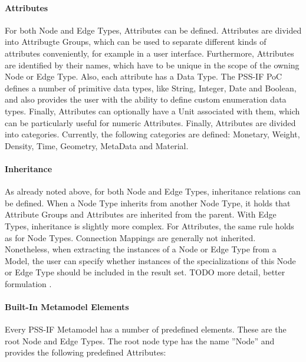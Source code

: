 \paragraph{Attributes}

For both Node and Edge Types, Attributes can be defined. Attributes are divided into Attribugte Groups, which can be used to separate different kinds of attributes conveniently, for example in a user interface. Furthermore, Attributes are identified by their names, which have to be unique in the scope of the owning Node or Edge Type. Also, each attribute has a Data Type. The PSS-IF PoC defines a number of primitive data types, like String, Integer, Date and Boolean, and also provides the user with the ability to define custom enumeration data types. Finally, Attributes can optionally have a Unit associated with them, which can be particularly useful for numeric Attributes. Finally, Attributes are divided into categories. Currently, the following categories are defined: Monetary, Weight, Density, Time, Geometry, MetaData and Material.

\paragraph{Inheritance}

As already noted above, for both Node and Edge Types, inheritance relations can be defined. When a Node Type inherits from another Node Type, it holds that Attribute Groups and Attributes are inherited from the parent. With Edge Types, inheritance is slightly more complex. For Attributes, the same rule holds as for Node Types. Connection Mappings are generally not inherited. Nonetheless, when extracting the instances of a Node or Edge Type from a Model, the user can specify whether instances of the specializations of this Node or Edge Type should be included in the result set. \color{red}TODO more detail, better formulation \color{black}.

\paragraph{Built-In Metamodel Elements}

Every PSS-IF Metamodel has a number of predefined elements. These are the root Node and Edge Types. The root node type has the name ''Node'' and provides the following predefined Attributes:

